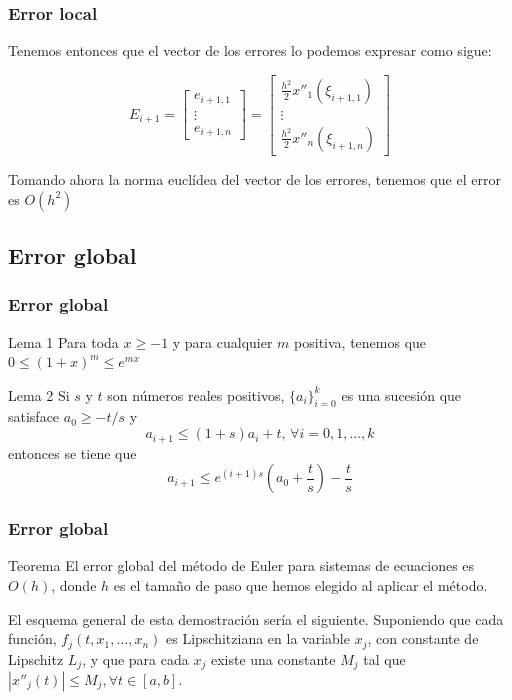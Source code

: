 \documentclass{beamer}
\begin{document}
\begin{frame}
	\frametitle{Error local}
	
	Tenemos entonces que el vector de los errores lo podemos expresar como sigue:
	
	\begin{equation*}
	E_{i+1}=\begin{bmatrix}
	e_{i+1, 1} \\
	\vdots \\
	e_{i+1, n}
	\end{bmatrix}=\begin{bmatrix}
	\frac{h^2}{2}x''_1(\xi_{i+1, 1}) \\
	\vdots \\
	\frac{h^2}{2}x''_n(\xi_{i+1, n})
	\end{bmatrix}
	\end{equation*}
	
	Tomando ahora la norma euclídea del vector de los errores, tenemos que el error es $O(h^2)$
\end{frame}

\subsection{Error global}
\begin{frame}
	\frametitle{Error global}
	
	\begin{block}{Lema 1}
		Para toda $x \geq -1$ y para cualquier $m$ positiva, tenemos que $0 \leq (1 + x)^m \leq e^{mx}$
	\end{block}
	
	
	\begin{block}{Lema 2}
		Si $s$ y $t$ son números reales positivos, $\{a_i\}^k_{i=0}$ es una sucesión que satisface $ a_0 \geq -t/s$ y
		$$a_{i+1} \leq (1+s)a_i + t, \, \forall i=0, 1, ..., k$$
		entonces se tiene que
		$$a_{i+1} \leq e^{(i+1)s}\left( a_0 + \frac{t}{s}\right) - \frac{t}{s}$$
	\end{block}
	
	
	
\end{frame}

\begin{frame}
	\frametitle{Error global}
	\begin{block}{Teorema}
		El error global del método de Euler para sistemas de ecuaciones es $O(h)$, donde $h$ es el tamaño de paso que hemos elegido al aplicar el método. 
	\end{block}
	
	El esquema general de esta demostración sería el siguiente. Suponiendo que cada función, $f_j(t, x_1, ..., x_n)$ es Lipschitziana en la variable $x_j$, con constante de Lipschitz $L_j$, y que para cada $x_j$ existe una constante $M_j$ tal que $| x''_j(t) | \leq M_j, \forall t \in [a,b]$.\\
	
	
\end{frame}
\end{document}
